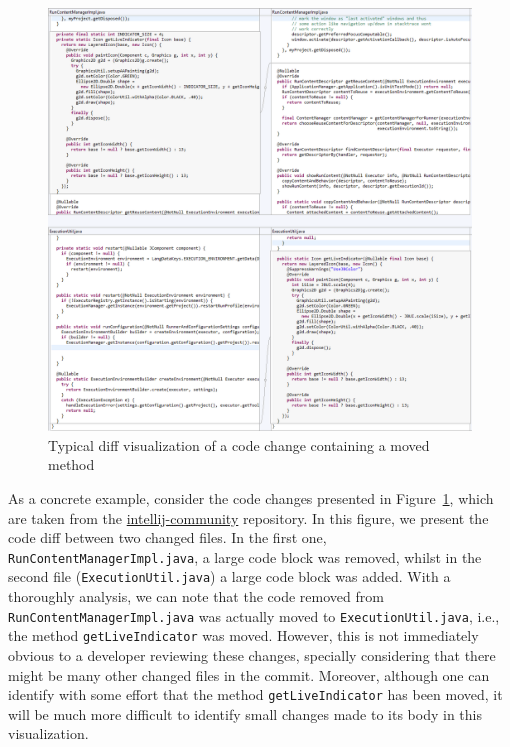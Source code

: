 \begin{figure}[htpb]
\centering
\includegraphics[width=\linewidth]{img/c1.png}
\caption{Typical diff visualization of a code change containing a moved method}
\label{FigRwDiff1}
\end{figure}

As a concrete example, consider the code changes presented in Figure~\ref{FigRwDiff1}, which are taken from the \url{intellij-community} repository. In this figure, we present the code diff between two changed files. In the first one, \texttt{RunContentManagerImpl.java}, a large code block was removed, whilst in the second file (\texttt{ExecutionUtil.java}) a large code block was added. With a thoroughly analysis, we can note that the code removed from \texttt{RunContentManagerImpl.java} was actually moved to \texttt{ExecutionUtil.java}, i.e., the method \texttt{getLiveIndicator} was moved.
However, this is not immediately obvious to a developer reviewing these changes, specially considering that there might be many other changed files in the commit. Moreover, although one can identify with some effort that the method \texttt{getLiveIndicator} has been moved, it will be much more difficult to identify small changes made to its body in this visualization.

